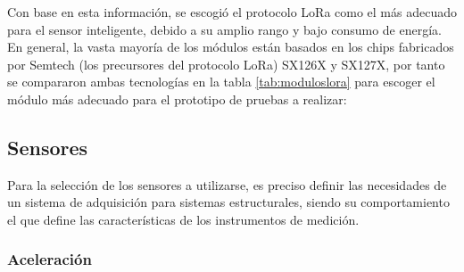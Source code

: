 Con base en esta información, se escogió el protocolo LoRa como el más adecuado para el sensor inteligente, debido a su amplio rango y bajo consumo de energía. En general, la vasta mayoría de los módulos están basados en los chips fabricados por Semtech (los precursores del protocolo LoRa) SX126X y SX127X, por tanto se compararon ambas tecnologías en la tabla \ref{tab:moduloslora} para escoger el módulo más adecuado para el prototipo de pruebas a realizar:
\begin{table}[H]
    \centering
    \caption{Comparación entre módulos LoRa del fabricante Semtech \citep{datasheetSemtech}.}
    \label{tab:moduloslora}
    \end{table}

\subsection{Sensores}

Para la selección de los sensores a utilizarse, es preciso definir las necesidades de un sistema de adquisición para sistemas estructurales, siendo su comportamiento el que define las características de los instrumentos de medición.

\subsubsection{Aceleración} 


